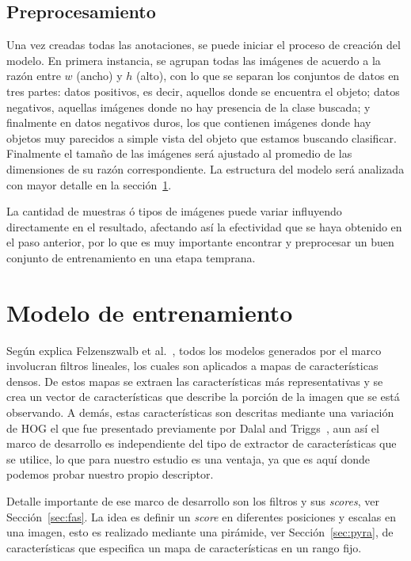 \subsection{Preprocesamiento}\label{subsec:pre}
Una vez creadas todas las anotaciones, se puede iniciar el proceso de creación del modelo. En primera instancia, se agrupan todas las imágenes de acuerdo a la razón entre $w$ (ancho) y $h$ (alto), con lo que se separan los conjuntos de datos en tres partes: datos positivos, es decir, aquellos donde se encuentra el objeto; datos negativos, aquellas imágenes donde no hay presencia de la clase buscada; y finalmente en datos negativos duros, los que contienen imágenes donde hay objetos muy parecidos a simple vista del objeto que estamos buscando clasificar. Finalmente el tamaño de las imágenes será ajustado al promedio de las dimensiones de su razón correspondiente. La estructura del modelo será analizada con mayor detalle en la sección~\ref{sec:model}.

La cantidad de muestras ó tipos de imágenes puede variar influyendo directamente en el resultado, afectando así la efectividad que se haya obtenido en el paso anterior, por lo que es muy importante encontrar y preprocesar un buen conjunto de entrenamiento en una etapa temprana.

\section{Modelo de entrenamiento}\label{sec:model}
Según explica Felzenszwalb et al.~\cite{Felzenszwalb2010}, todos los modelos generados por el marco involucran filtros lineales, los cuales son aplicados a mapas de características densos. De estos mapas se extraen las características más representativas y se crea un vector de características que describe la porción de la imagen que se está observando. A demás, estas características son descritas mediante una variación de HOG el que fue presentado previamente por Dalal and Triggs~\cite{Dalal2005}, aun así el marco de desarrollo es independiente del tipo de extractor de características que se utilice, lo que para nuestro estudio es una ventaja, ya que es aquí donde podemos probar nuestro propio descriptor.

Detalle importante de ese marco de desarrollo son los filtros y sus \textit{scores}, ver Sección~\ref{sec:fas}. La idea es definir un \textit{score} en diferentes posiciones y escalas en una imagen, esto es realizado mediante una pirámide, ver Sección~\ref{sec:pyra}, de características que especifica un mapa de características en un rango fijo.

